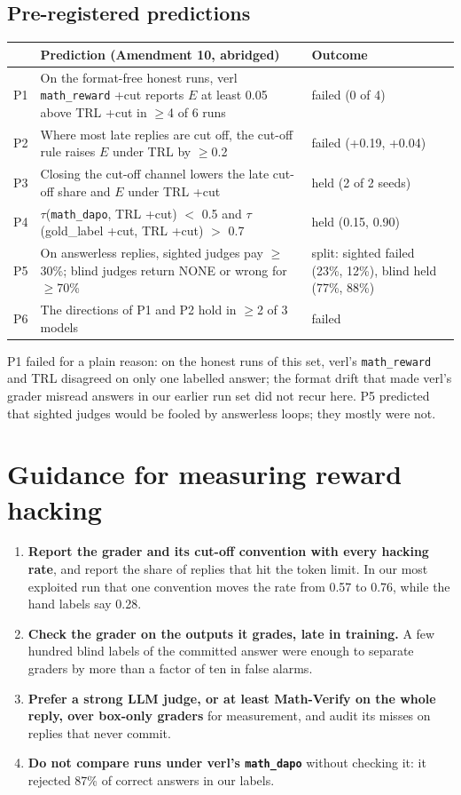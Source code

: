 \documentclass[10pt]{article}
\newcommand{\E}{E}
\begin{document}
\subsection{Pre-registered predictions}
\begin{table}[H]
\centering\small
\begin{tabularx}{\linewidth}{l X l}
\toprule
& Prediction (Amendment 10, abridged) & Outcome \\
\midrule
P1 & On the format-free honest runs, verl \texttt{math\_reward} +cut reports $\E$ at least 0.05 above TRL +cut in $\geq$4 of 6 runs & failed (0 of 4) \\
P2 & Where most late replies are cut off, the cut-off rule raises $\E$ under TRL by $\geq$0.2 & failed (+0.19, +0.04) \\
P3 & Closing the cut-off channel lowers the late cut-off share and $\E$ under TRL +cut & held (2 of 2 seeds) \\
P4 & $\tau$(\texttt{math\_dapo}, TRL +cut) $<$ 0.5 and $\tau$(gold\_label +cut, TRL +cut) $>$ 0.7 & held (0.15, 0.90) \\
P5 & On answerless replies, sighted judges pay $\geq$30\%; blind judges return NONE or wrong for $\geq$70\% & split: sighted failed (23\%, 12\%), blind held (77\%, 88\%) \\
P6 & The directions of P1 and P2 hold in $\geq$2 of 3 models & failed \\
\bottomrule
\end{tabularx}
\end{table}
P1 failed for a plain reason: on the honest runs of this set, verl's \texttt{math\_reward} and TRL disagreed
on only one labelled answer; the format drift that made verl's grader misread answers in our earlier run
set \citep{sangshetti2026formatdrift} did not recur here. P5 predicted that sighted judges would be fooled
by answerless loops; they mostly were not.

\section{Guidance for measuring reward hacking}
\label{sec:guidance}
\begin{enumerate}
\item \textbf{Report the grader and its cut-off convention with every hacking rate}, and report the share of
replies that hit the token limit. In our most exploited run that one convention moves the rate from 0.57
to 0.76, while the hand labels say 0.28.
\item \textbf{Check the grader on the outputs it grades, late in training.} A few hundred blind labels of
the committed answer were enough to separate graders by more than a factor of ten in false alarms.
\item \textbf{Prefer a strong LLM judge, or at least Math-Verify on the whole reply, over box-only graders}
for measurement, and audit its misses on replies that never commit.
\item \textbf{Do not compare runs under verl's \texttt{math\_dapo}} without checking it: it rejected 87\%
of correct answers in our labels.
\end{enumerate}
\end{document}
